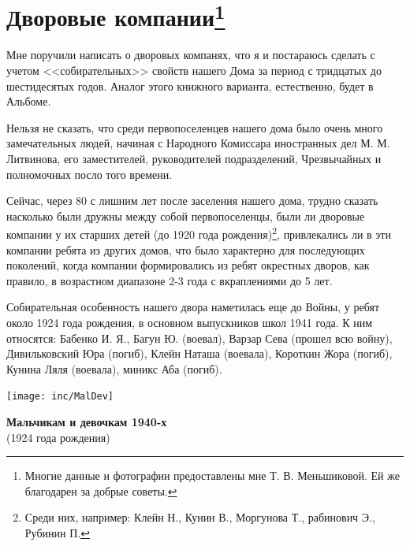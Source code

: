 \chapter{Дворовые компании\protect\footnote{Многие данные и фотографии предоставлены мне Т. В. Меньшиковой. Ей же благодарен за добрые советы.}}

Мне поручили написать о дворовых компанях, что я и постараюсь сделать с учетом <<собирательных>> свойств нашего Дома за период с тридцатых до шестидесятых годов. Аналог этого книжного варианта, естественно, будет в Альбоме.

Нельзя не сказать, что среди первопоселенцев нашего дома было очень много замечательных людей, начиная с Народного Комиссара иностранных дел М. М. Литвинова, его заместителей, руководителей подразделений, Чрезвычайных и полномочных посло того времени.

Сейчас, через 80 с лишним лет после заселения нашего дома, трудно сказать насколько были дружны между собой первопоселенцы, были ли дворовые компании у их старших детей (до 1920 года рождения)\footnote{Среди них, например: Клейн Н., Кунин В., Моргунова Т., рабинович Э., Рубинин П.}, привлекались ли в эти компании ребята из других домов, что было характерно для последующих поколений, когда компании формировались из ребят окрестных дворов, как правило, в возрастном диапазоне 2-3 года с вкраплениями до 5 лет.

Собирательная особенность нашего двора наметилась еще до Войны, у ребят около 1924 года рождения, в основном выпускников школ 1941 года. К ним относятся: Бабенко И. Я., Багун Ю. (воевал), Варзар Сева (прошел всю войну), Дивильковский Юра (погиб), Клейн Наташа (воевала), Короткин Жора (погиб), Кунина Ляля (воевала), миникс Аба (погиб).

\newpage %

\begin{center}
    \texttt{[image: inc/MalDev]}
\end{center}
\begin{center}
    \footnotesize{\textbf {Мальчикам и девочкам 1940-х} \\(1924 года рождения)}
\end{center}

